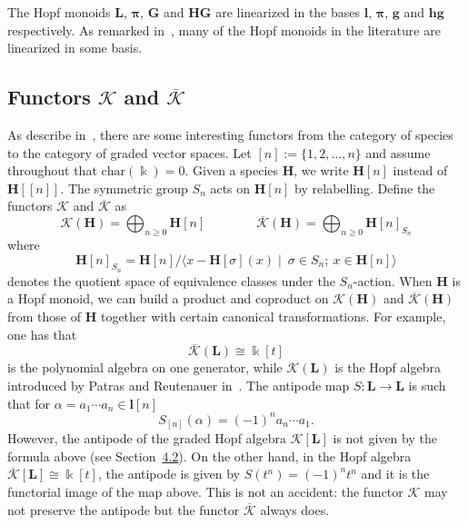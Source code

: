 \documentclass[10pt]{amsart}
\theoremstyle{definition}
\def\field{\Bbbk}
\newcommand{\bL}{\mathbf{L}}
\newcommand{\bH}{\mathbf{H}}
\newcommand{\bPi}{\bpi}
\newcommand{\bG}{\mathbf{G}}
\newcommand{\bpi}{\boldsymbol \pi}
\newcommand{\Kc}{\mathcal{K}}
\newcommand{\Kcb}{\overline{\Kc}}
\begin{document}
The Hopf monoids $\bL$, $\bPi$, $\bG$ and $\mathbf{HG}$ are linearized in the bases $\mathbf{l}$, $\bpi$, $\mathbf{g}$ and $\mathbf{hg}$ respectively. As remarked in~\cite{MarbergLin}, many of the Hopf monoids in the literature are linearized in some basis. 

\subsection{Functors \texorpdfstring{$\mathcal{K}$}{K} and \texorpdfstring{$\overline{\mathcal{K}}$}{overline K}} \label{ss:K_Kbar} 
As describe in~\cite[Section~III]{AM:2010}, there are some interesting functors from the category of species to the category of graded vector spaces. Let $[n]:=\{1,2,\ldots,n\}$ and assume throughout that $\text{char}(\field)=0$. Given a species $\bH$, we write $\bH[n]$ instead of $\bH[[n]]$. The symmetric group $S_n$ acts on $\bH[n]$ by relabelling. Define the functors $\Kc$ and $\Kcb$ as
 $$ \Kc(\mathbf{H}) = \bigoplus_{n\ge 0} \mathbf{H}[n]
 \qquad\qquad
 \Kcb(\mathbf{H}) = \bigoplus_{n\ge 0} \mathbf{H}[n]_{S_n}
 $$
where
 $$
 \mathbf{H}[n]_{S_n}={\bH}[n]\Big/ \langle x-{\bH}[\sigma](x) \mid \ \sigma\in S_n; \ x\in {\bH}[n]\rangle
 $$
 denotes the quotient space of equivalence classes under the $S_n$-action. When $\bH$ is a Hopf monoid, 
 we can build a product and coproduct
on $ \Kc({\bH})$ and $ \Kcb({\bH})$ from those of $\bH$ together
with certain canonical transformations.
For example, one has that
\[
\Kcb(\bL)\cong\field[t]
\]
is the polynomial algebra on one generator, while $\Kc(\bL)$
is the Hopf algebra introduced by Patras and Reutenauer in~\cite{PR:2004}. The antipode map $S:\bL\rightarrow\bL$ is such that
for $\alpha=a_1\cdots a_n\in\mathbf{l}[n]$
 $$ S_{[n]}(\alpha)=(-1)^n a_n\cdots a_1.$$
 However, the antipode of the graded Hopf algebra $\Kc[\bL]$ is not given by the formula above (see Section~\href{https://alco.centre-mersenne.org/articles/10.5802/alco.53/}{4.2}). On the other hand, in the Hopf algebra $\Kcb[\bL]\cong \field[t]$, the antipode is given by $S(t^n)=(-1)^nt^n$ and it is the functorial image of the map above. This is not an accident: the functor $\Kc$ may not preserve the antipode but the functor $\Kcb$ always does.

\end{document}
